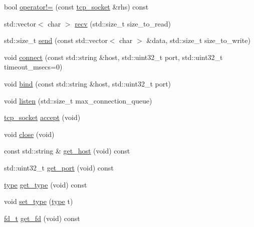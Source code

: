 \begin{DoxyCompactItemize}
\item 
bool \hyperlink{classtacopie_1_1tcp__socket_a76f69612969374b5aa542378d37ee398}{operator!=} (const \hyperlink{classtacopie_1_1tcp__socket}{tcp\+\_\+socket} \&rhs) const
\item 
std\+::vector$<$ char $>$ \hyperlink{classtacopie_1_1tcp__socket_a0d6d30258a902d12b3c2c62644756685}{recv} (std\+::size\+\_\+t size\+\_\+to\+\_\+read)
\item 
std\+::size\+\_\+t \hyperlink{classtacopie_1_1tcp__socket_a36521a8f502adc665ad0fb1c53583d04}{send} (const std\+::vector$<$ char $>$ \&data, std\+::size\+\_\+t size\+\_\+to\+\_\+write)
\item 
void \hyperlink{classtacopie_1_1tcp__socket_a6748c78312763dca6b8be05c4c8c3419}{connect} (const std\+::string \&host, std\+::uint32\+\_\+t port, std\+::uint32\+\_\+t timeout\+\_\+msecs=0)
\item 
void \hyperlink{classtacopie_1_1tcp__socket_a910a183d7c45483f1cdacd10a1896155}{bind} (const std\+::string \&host, std\+::uint32\+\_\+t port)
\item 
void \hyperlink{classtacopie_1_1tcp__socket_af0957ded2a84fb06d940cba98df477fb}{listen} (std\+::size\+\_\+t max\+\_\+connection\+\_\+queue)
\item 
\hyperlink{classtacopie_1_1tcp__socket}{tcp\+\_\+socket} \hyperlink{classtacopie_1_1tcp__socket_af5113c9332f83643cdaaf15c3f137760}{accept} (void)
\item 
void \hyperlink{classtacopie_1_1tcp__socket_ad5a30b17b1dad9f0ff40305e246a9213}{close} (void)
\item 
const std\+::string \& \hyperlink{classtacopie_1_1tcp__socket_ad294565f9a0fa52639ecfbf133eecd59}{get\+\_\+host} (void) const
\item 
std\+::uint32\+\_\+t \hyperlink{classtacopie_1_1tcp__socket_a5276fdc687ac3c5089a05e3e2d9de4fb}{get\+\_\+port} (void) const
\item 
\hyperlink{classtacopie_1_1tcp__socket_ad8376e85df96ab9523f5d079ed7172ab}{type} \hyperlink{classtacopie_1_1tcp__socket_a4f663be51b845520505bc20a88b411ee}{get\+\_\+type} (void) const
\item 
void \hyperlink{classtacopie_1_1tcp__socket_a89be86ab254eec3fc16eedfba8b16fb2}{set\+\_\+type} (\hyperlink{classtacopie_1_1tcp__socket_ad8376e85df96ab9523f5d079ed7172ab}{type} t)
\item 
\hyperlink{namespacetacopie_acce7ad26b2d30156b1e6fa353f727026}{fd\+\_\+t} \hyperlink{classtacopie_1_1tcp__socket_a4fd367a1802ed6ae7fa0e33fc07ed255}{get\+\_\+fd} (void) const
\end{DoxyCompactItemize}

